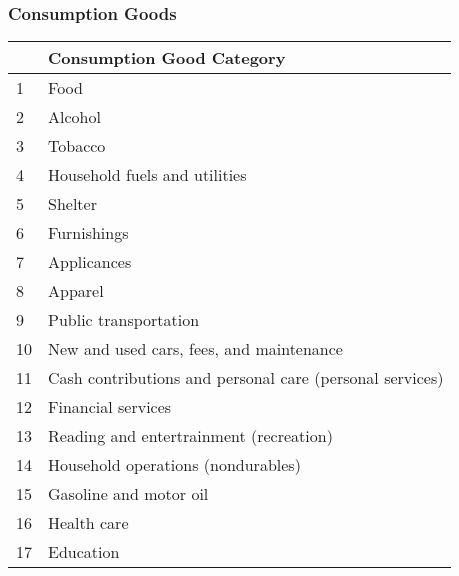 \documentclass{beamer}
\begin{document}
  \begin{frame}
    \frametitle{Consumption Goods}
    \begin{table}[htbp]
      \centering
      \tiny
        \begin{tabular}{ll}
        \hline
        \hline
              & Consumption Good Category \\
        \hline
        1     & Food  \\
        2     & Alcohol \\
        3     & Tobacco \\
        4     & Household fuels and utilities \\
        5     & Shelter \\
        6     & Furnishings \\
        7     & Applicances \\
        8     & Apparel \\
        9     & Public transportation \\
        10    & New and used cars, fees, and maintenance \\
        11    & Cash contributions and personal care (personal services) \\
        12    & Financial services \\
        13    & Reading and entertrainment (recreation) \\
        14    & Household operations (nondurables) \\
        15    & Gasoline and motor oil \\
        16    & Health care \\
        17    & Education \\
        \hline
        \hline
        \end{tabular}%
    \end{table}%
  \end{frame}
\end{document}

